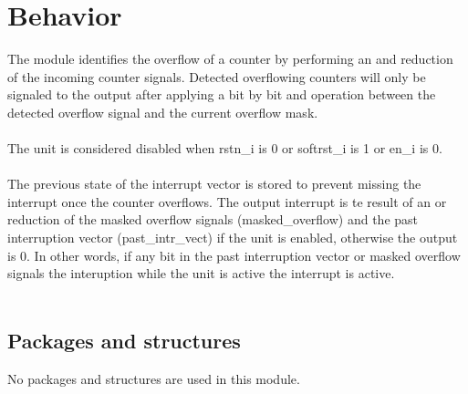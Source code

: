\section{Behavior}

The module identifies the overflow of a counter by performing an and reduction of the incoming counter signals. Detected overflowing counters will only be signaled to the output after applying a bit by bit and operation between the detected overflow signal and the current overflow mask.\\
\\
The unit is considered disabled when rstn\_i is 0 or softrst\_i is 1 or en\_i is 0.\\
\\
The previous state of the interrupt vector is stored to prevent missing the interrupt once the counter overflows. The output interrupt is te result of an or reduction of the masked overflow signals (masked\_overflow) and the past interruption vector (past\_intr\_vect) if the unit is enabled, otherwise the output is 0. In other words, if any bit in the past interruption vector or masked overflow signals the interuption while the unit is active the interrupt is active.\\
\\
\subsection{Packages and structures}

No packages and structures are used in this module.

